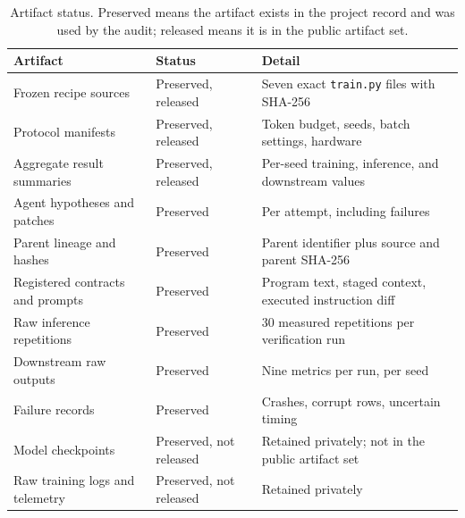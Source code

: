 \documentclass{article}
\begin{document}
\begin{table}[t]
\caption{Artifact status. Preserved means the artifact exists in the project record and was used by the audit; released means it is in the public artifact set.}\label{tab:repro}
\centering\small
\begin{tabular}{lll}
\toprule
Artifact & Status & Detail \\
\midrule
Frozen recipe sources & Preserved, released & Seven exact \texttt{train.py} files with SHA-256 \\
Protocol manifests & Preserved, released & Token budget, seeds, batch settings, hardware \\
Aggregate result summaries & Preserved, released & Per-seed training, inference, and downstream values \\
Agent hypotheses and patches & Preserved & Per attempt, including failures \\
Parent lineage and hashes & Preserved & Parent identifier plus source and parent SHA-256 \\
Registered contracts and prompts & Preserved & Program text, staged context, executed instruction diff \\
Raw inference repetitions & Preserved & 30 measured repetitions per verification run \\
Downstream raw outputs & Preserved & Nine metrics per run, per seed \\
Failure records & Preserved & Crashes, corrupt rows, uncertain timing \\
Model checkpoints & Preserved, not released & Retained privately; not in the public artifact set \\
Raw training logs and telemetry & Preserved, not released & Retained privately \\
\bottomrule
\end{tabular}
\end{table}
\end{document}
